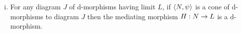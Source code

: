 \documentclass[10pt,a4paper]{article}
\begin{document}
\begin{enumerate} [(i)]
\noindent if
\begin{center}
$
\begin{array}{cp{0cm}cp{0cm}c}
\Rnode{B1}{B_1}& &            &  &\Rnode{B2}{B_2} \\ [1.2cm]
               & &\Rnode{A}{A}& &
\end{array}
$
\end{center}

\noindent then
$B_2[b_1|b_2]=B_1[b_2|b_1]$ and $q(b_1,b_2)= b_2\sub b_1 $ and $q(b_2,b_1)= b_1 \sub b_2$
\noindent
so that we have:

\begin{center}
$
\begin{array}{ccc}
               & \Rnode{X}{B_2[b_1|b_2]=B_1[b_2|b_1]}&                \\ [1.2cm]
\Rnode{B1}{B_1}&                                     &\Rnode{B2}{B_2} \\ [1.2cm]
               & \Rnode{A}{A}                        & 
\end{array}
$
\end{center}



\item For any diagram $J$ of d-morphisms having limit $L$, if $\left\langle N,\psi\right\rangle$ is a cone of d-morphisms 
to diagram $J$ then the mediating morphism $H:N \rightarrow L$ is a d-morphism.
\end{enumerate}
 


\end{document}
